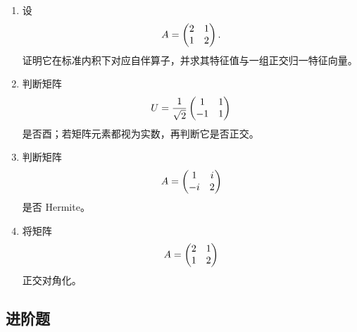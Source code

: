\begin{enumerate}[label=\textbf{5.\arabic*.}]
  \item \basic 设
  \[
  A=\begin{pmatrix} 2&1\\1&2 \end{pmatrix}.
  \]
  证明它在标准内积下对应自伴算子，并求其特征值与一组正交归一特征向量。

  \item \basic 判断矩阵
  \[
  U=\frac{1}{\sqrt2}\begin{pmatrix} 1&1\\-1&1 \end{pmatrix}
  \]
  是否酉；若矩阵元素都视为实数，再判断它是否正交。

  \item \basic 判断矩阵
  \[
  A=\begin{pmatrix} 1&i\\-i&2 \end{pmatrix}
  \]
  是否 Hermite。

  \item \basic 将矩阵
  \[
  A=\begin{pmatrix} 2&1\\1&2 \end{pmatrix}
  \]
  正交对角化。
\end{enumerate}

\subsection*{进阶题}

